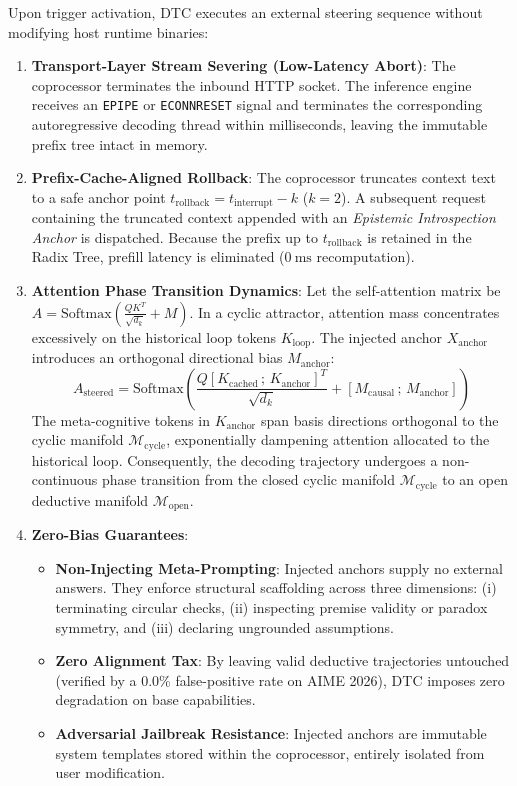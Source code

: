\documentclass[11pt,a4paper]{article}
\begin{document}
Upon trigger activation, DTC executes an external steering sequence without modifying host runtime binaries:
\begin{enumerate}
    \item \textbf{Transport-Layer Stream Severing (Low-Latency Abort)}: The coprocessor terminates the inbound HTTP socket. The inference engine receives an \texttt{EPIPE} or \texttt{ECONNRESET} signal and terminates the corresponding autoregressive decoding thread within milliseconds, leaving the immutable prefix tree intact in memory.
    \item \textbf{Prefix-Cache-Aligned Rollback}: The coprocessor truncates context text to a safe anchor point $t_{\mathrm{rollback}} = t_{\mathrm{interrupt}} - k$ ($k=2$). A subsequent request containing the truncated context appended with an \textit{Epistemic Introspection Anchor} is dispatched. Because the prefix up to $t_{\mathrm{rollback}}$ is retained in the Radix Tree, prefill latency is eliminated ($0\ \mathrm{ms}$ recomputation).
    \item \textbf{Attention Phase Transition Dynamics}: Let the self-attention matrix be $A = \mathrm{Softmax}\left(\frac{QK^T}{\sqrt{d_k}} + M\right)$. In a cyclic attractor, attention mass concentrates excessively on the historical loop tokens $K_{\mathrm{loop}}$. The injected anchor $X_{\mathrm{anchor}}$ introduces an orthogonal directional bias $M_{\mathrm{anchor}}$:
    \begin{equation}
    A_{\mathrm{steered}} = \mathrm{Softmax}\left(\frac{Q [K_{\mathrm{cached}} \,;\, K_{\mathrm{anchor}}]^T}{\sqrt{d_k}} + [M_{\mathrm{causal}} \,;\, M_{\mathrm{anchor}}]\right)
    \end{equation}
    The meta-cognitive tokens in $K_{\mathrm{anchor}}$ span basis directions orthogonal to the cyclic manifold $\mathcal{M}_{\mathrm{cycle}}$, exponentially dampening attention allocated to the historical loop. Consequently, the decoding trajectory undergoes a non-continuous phase transition from the closed cyclic manifold $\mathcal{M}_{\mathrm{cycle}}$ to an open deductive manifold $\mathcal{M}_{\mathrm{open}}$.
    \item \textbf{Zero-Bias Guarantees}:
    \begin{itemize}
        \item \textbf{Non-Injecting Meta-Prompting}: Injected anchors supply no external answers. They enforce structural scaffolding across three dimensions: (i) terminating circular checks, (ii) inspecting premise validity or paradox symmetry, and (iii) declaring ungrounded assumptions.
        \item \textbf{Zero Alignment Tax}: By leaving valid deductive trajectories untouched (verified by a 0.0\% false-positive rate on AIME 2026), DTC imposes zero degradation on base capabilities.
        \item \textbf{Adversarial Jailbreak Resistance}: Injected anchors are immutable system templates stored within the coprocessor, entirely isolated from user modification.
    \end{itemize}
\end{enumerate}
\end{document}

